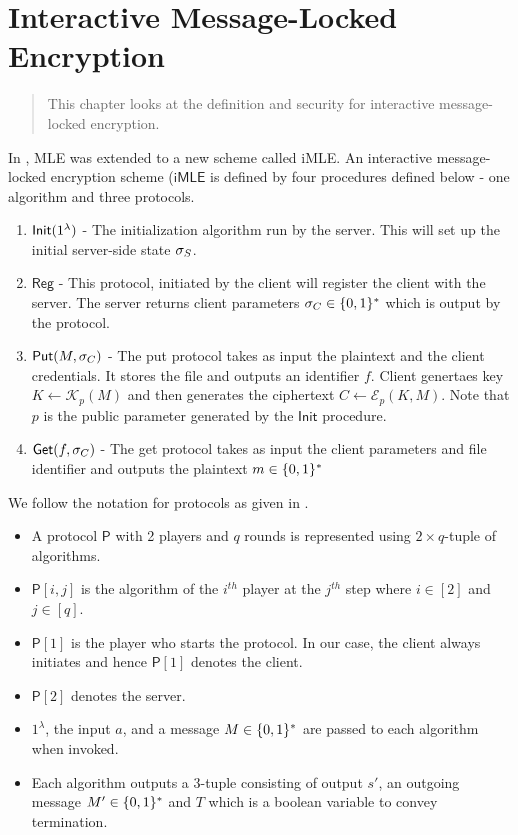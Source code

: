 \chapter{Interactive Message-Locked Encryption}
\label{chap:imle}

\begin{quote} \small
	This chapter looks at the definition and security for interactive message-locked encryption.
\end{quote}

\noindent
In \cite{imle}, MLE was extended to a new scheme called iMLE. An interactive message-locked encryption scheme ($\mathsf{iMLE}$ is defined by four procedures defined below - one algorithm and three protocols.
\begin{enumerate}
	\item $\mathsf{Init}(1^{\lambda})$ - The initialization algorithm run by the server. This will set up the initial server-side state $\sigma_S$.
	
	\item $\mathsf{Reg}$ - This protocol, initiated by the client will register the client with the server. The server returns client parameters $\sigma_C \in \{0,1\}^*$ which is output by the protocol.
	
	\item $\mathsf{Put}(M, \sigma_C)$ - The put protocol takes as input the plaintext and the client credentials. It stores the file and outputs an identifier $f$. Client genertaes key $K \leftarrow \mathcal{K}_{p}(M)$ and then generates the ciphertext $C \leftarrow \mathcal{E}_{p}(K, M)$. Note that $p$ is the public parameter generated by the $\mathsf{Init}$ procedure.
	
	\item $\mathsf{Get}(f, \sigma_C)$ - The get protocol takes as input the client parameters and file identifier and outputs the plaintext $m \in \{0,1\}^*$
\end{enumerate}

We follow the notation for protocols as given in \cite{imle}.
\begin{itemize}
	\item A protocol $\mathsf{P}$ with 2 players and $q$ rounds is represented using $2 \times q$-tuple of algorithms.
	\item $\mathsf{P}[i,j]$ is the algorithm of the $i^{th}$ player at the $j^{th}$ step where $i \in [2]$ and $j \in [q]$.
	\item $\mathsf{P}[1]$ is the player who starts the protocol. In our case, the client always initiates and hence $\mathsf{P}[1]$ denotes the client.
	\item $\mathsf{P}[2]$ denotes the server.
	\item $1^\lambda$, the input $a$, and a message $M \in \{0,1\}^*$ are passed to each algorithm when invoked.
	\item Each algorithm outputs a 3-tuple consisting of output $s'$, an outgoing message $M' \in \{0,1\}^*$ and $T$ which is a boolean variable to convey termination.
\end{itemize}

